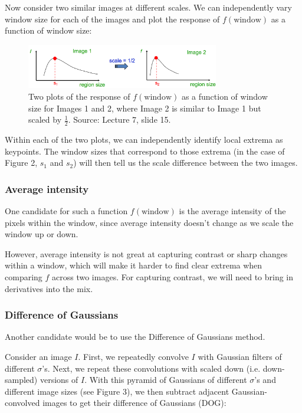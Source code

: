 \documentclass{article}
\begin{document}
Now consider two similar images at different scales. We can independently vary window size for each of the images and plot the response of $f(\text{window})$ as a function of window size:

\begin{figure}[h]
  \centering
  \includegraphics[width=0.75\textwidth]{max}
  \caption{Two plots of the response of $f(\text{window})$ as a function of window size for Images 1 and 2, where Image 2 is similar to Image 1 but scaled by $\frac{1}{2}$. Source: Lecture 7, slide 15.}
\end{figure}

Within each of the two plots, we can independently identify local extrema as keypoints. The window sizes that correspond to those extrema (in the case of Figure 2, $s_1$ and $s_2$) will then tell us the scale difference between the two images.

\subsubsection{Average intensity}
One candidate for such a function $f(\text{window})$ is the average intensity of the pixels within the window, since average intensity doesn't change as we scale the window up or down. 

However, average intensity is not great at capturing contrast or sharp changes within a window, which will make it harder to find clear extrema when comparing $f$ across two images. For capturing contrast, we will need to bring in derivatives into the mix.

\subsubsection{Difference of Gaussians}
Another candidate would be to use the Difference of Gaussians method. 

Consider an image $I$. First, we repeatedly convolve $I$ with Gaussian filters of different $\sigma$'s. Next, we repeat these convolutions with scaled down (i.e. down-sampled) versions of $I$. With this pyramid of Gaussians of different $\sigma$'s and different image sizes (see Figure 3), we then subtract adjacent Gaussian-convolved images to get their difference of Gaussians (DOG):
\end{document}
